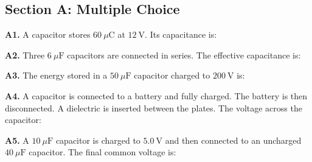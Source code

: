 \newpage
\begin{exercisebox}[22]

\subsection*{Section A: Multiple Choice}

\textbf{A1.} A capacitor stores $60\ \mu\text{C}$
at $12\ \text{V}$. Its capacitance is:


\vspace{0.4cm}

\textbf{A2.} Three $6\ \mu\text{F}$ capacitors are
connected in series. The effective capacitance is:


\vspace{0.4cm}

\textbf{A3.} The energy stored in a $50\ \mu\text{F}$
capacitor charged to $200\ \text{V}$ is:


\vspace{0.4cm}

\textbf{A4.} A capacitor is connected to a battery
and fully charged. The battery is then disconnected.
A dielectric is inserted between the plates. The
voltage across the capacitor:


\vspace{0.4cm}

\textbf{A5.} A $10\ \mu\text{F}$ capacitor is
charged to $5.0\ \text{V}$ and then connected to
an uncharged $40\ \mu\text{F}$ capacitor. The final
common voltage is:


\vspace{0.4cm}


\end{exercisebox}
